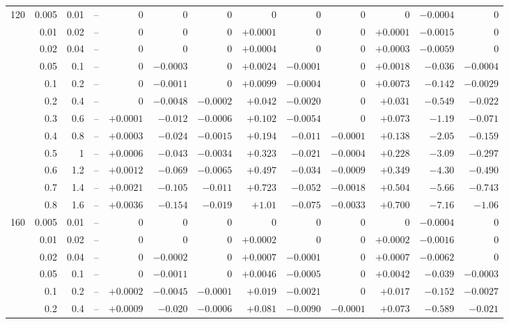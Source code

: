 \documentclass[11pt,a4paper]{article}
\begin{document}
\begin{table}[htbp]
\begin{tabular}{rrrrrrrrrrrrr}
\midrule
120 & 0.005 & 0.01 & -- & $0$ & $0$ & $0$ & $0$ & $0$ & $0$ & $0$ & $-0.0004$ & $0$ \\
 & 0.01 & 0.02 & -- & $0$ & $0$ & $0$ & $+0.0001$ & $0$ & $0$ & $+0.0001$ & $-0.0015$ & $0$ \\
 & 0.02 & 0.04 & -- & $0$ & $0$ & $0$ & $+0.0004$ & $0$ & $0$ & $+0.0003$ & $-0.0059$ & $0$ \\
 & 0.05 & 0.1 & -- & $0$ & $-0.0003$ & $0$ & $+0.0024$ & $-0.0001$ & $0$ & $+0.0018$ & $-0.036$ & $-0.0004$ \\
 & 0.1 & 0.2 & -- & $0$ & $-0.0011$ & $0$ & $+0.0099$ & $-0.0004$ & $0$ & $+0.0073$ & $-0.142$ & $-0.0029$ \\
 & 0.2 & 0.4 & -- & $0$ & $-0.0048$ & $-0.0002$ & $+0.042$ & $-0.0020$ & $0$ & $+0.031$ & $-0.549$ & $-0.022$ \\
 & 0.3 & 0.6 & -- & $+0.0001$ & $-0.012$ & $-0.0006$ & $+0.102$ & $-0.0054$ & $0$ & $+0.073$ & $-1.19$ & $-0.071$ \\
 & 0.4 & 0.8 & -- & $+0.0003$ & $-0.024$ & $-0.0015$ & $+0.194$ & $-0.011$ & $-0.0001$ & $+0.138$ & $-2.05$ & $-0.159$ \\
 & 0.5 & 1 & -- & $+0.0006$ & $-0.043$ & $-0.0034$ & $+0.323$ & $-0.021$ & $-0.0004$ & $+0.228$ & $-3.09$ & $-0.297$ \\
 & 0.6 & 1.2 & -- & $+0.0012$ & $-0.069$ & $-0.0065$ & $+0.497$ & $-0.034$ & $-0.0009$ & $+0.349$ & $-4.30$ & $-0.490$ \\
 & 0.7 & 1.4 & -- & $+0.0021$ & $-0.105$ & $-0.011$ & $+0.723$ & $-0.052$ & $-0.0018$ & $+0.504$ & $-5.66$ & $-0.743$ \\
 & 0.8 & 1.6 & -- & $+0.0036$ & $-0.154$ & $-0.019$ & $+1.01$ & $-0.075$ & $-0.0033$ & $+0.700$ & $-7.16$ & $-1.06$ \\
\midrule
160 & 0.005 & 0.01 & -- & $0$ & $0$ & $0$ & $0$ & $0$ & $0$ & $0$ & $-0.0004$ & $0$ \\
 & 0.01 & 0.02 & -- & $0$ & $0$ & $0$ & $+0.0002$ & $0$ & $0$ & $+0.0002$ & $-0.0016$ & $0$ \\
 & 0.02 & 0.04 & -- & $0$ & $-0.0002$ & $0$ & $+0.0007$ & $-0.0001$ & $0$ & $+0.0007$ & $-0.0062$ & $0$ \\
 & 0.05 & 0.1 & -- & $0$ & $-0.0011$ & $0$ & $+0.0046$ & $-0.0005$ & $0$ & $+0.0042$ & $-0.039$ & $-0.0003$ \\
 & 0.1 & 0.2 & -- & $+0.0002$ & $-0.0045$ & $-0.0001$ & $+0.019$ & $-0.0021$ & $0$ & $+0.017$ & $-0.152$ & $-0.0027$ \\
 & 0.2 & 0.4 & -- & $+0.0009$ & $-0.020$ & $-0.0006$ & $+0.081$ & $-0.0090$ & $-0.0001$ & $+0.073$ & $-0.589$ & $-0.021$ \\

\end{tabular}
\end{table}
\end{document}
